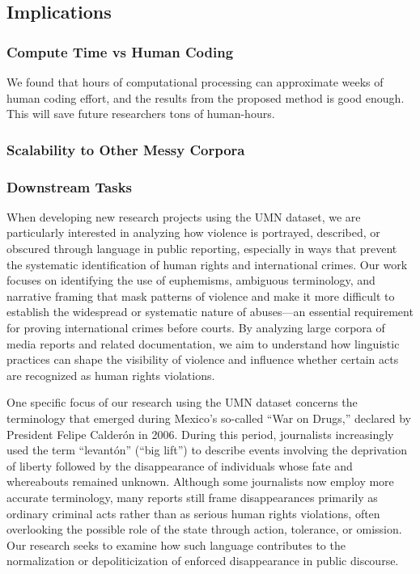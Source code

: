 \documentclass{article}
\begin{document}
\subsection{Implications}\label{implications}

\subsubsection{Compute Time vs Human
Coding}\label{compute-time-vs-human-coding}

We found that hours of computational processing can approximate weeks of
human coding effort, and the results from the proposed method is good
enough. This will save future researchers tons of human-hours.

\subsubsection{Scalability to Other Messy
Corpora}\label{scalability-to-other-messy-corpora}

\subsubsection{Downstream Tasks}\label{downstream-tasks}

When developing new research projects using the UMN dataset, we are particularly interested in analyzing how violence is portrayed, described, or obscured through language in public reporting, especially in ways that prevent the systematic identification of human rights and international crimes. Our work focuses on identifying the use of euphemisms, ambiguous terminology, and narrative framing that mask patterns of violence and make it more difficult to establish the widespread or systematic nature of abuses—an essential requirement for proving international crimes before courts. By analyzing large corpora of media reports and related documentation, we aim to understand how linguistic practices can shape the visibility of violence and influence whether certain acts are recognized as human rights violations.

One specific focus of our research using the UMN dataset concerns the terminology that emerged during Mexico’s so-called “War on Drugs,” declared by President Felipe Calderón in 2006. During this period, journalists increasingly used the term “levantón” (“big lift”) to describe events involving the deprivation of liberty followed by the disappearance of individuals whose fate and whereabouts remained unknown. Although some journalists now employ more accurate terminology, many reports still frame disappearances primarily as ordinary criminal acts rather than as serious human rights violations, often overlooking the possible role of the state through action, tolerance, or omission. Our research seeks to examine how such language contributes to the normalization or depoliticization of enforced disappearance in public discourse.
\end{document}
